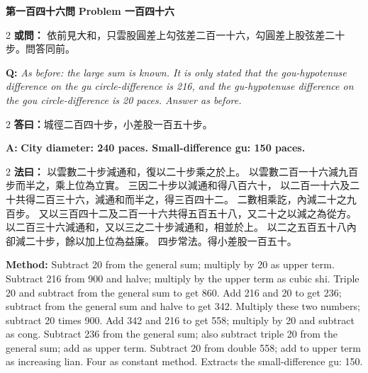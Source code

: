 \documentclass[11pt,a4paper]{article}
\newcommand{\wen}[1]{%
  \par\vspace{0.5em}%
  \noindent\textcolor{problemcolor}{\textbf{第#1問}}%
  \hfill\textcolor{problemcolor}{\textbf{Problem #1}}\par\nopagebreak%
  \vspace{0.3em}%
}
\newcommand{\owen}[1]{%
  \noindent\textcolor{problemcolor}{\textbf{或問：}}{\tradfont #1}\par\nopagebreak%
}
\newcommand{\oweneng}[1]{%
  \noindent\textcolor{engcolor}{\textbf{Q: }}{\itshape #1}\par\nopagebreak%
}
\newcommand{\fayue}[1]{%
  \noindent\textcolor{methodcolor}{\textbf{法曰：}}{\tradfont #1}\par\nopagebreak%
}
\newcommand{\fayueeng}[1]{%
  \noindent\textcolor{engcolor}{\textbf{Method: }}{#1}\par\nopagebreak%
}
\newcommand{\dayue}[1]{%
  \noindent\textcolor{anscolor}{\textbf{答曰：}}{\tradfont #1}\par\nopagebreak%
}
\newcommand{\dayueeng}[1]{%
  \noindent\textcolor{engcolor}{\textbf{A: }}{\bfseries #1}\par\nopagebreak%
}
\begin{document}
\vspace{0.5cm}

\wen{一百四十六}

\begin{paracol}{2}
\owen{%
依前見大和，只雲股圓差上勾弦差二百一十六，勾圓差上股弦差二十步。問答同前。}
\switchcolumn
\oweneng{%
As before: the large sum is known. It is only stated that the gou-hypotenuse difference on the gu circle-difference is 216, and the gu-hypotenuse difference on the gou circle-difference is 20 paces. Answer as before.}
\end{paracol}

\begin{paracol}{2}
\dayue{城徑二百四十步，小差股一百五十步。}
\switchcolumn
\dayueeng{City diameter: 240 paces. Small-difference gu: 150 paces.}
\end{paracol}

\begin{paracol}{2}
\fayue{%
以雲數二十步減通和，復以二十步乘之於上。
以雲數二百一十六減九百步而半之，乘上位為立實。
三因二十步以減通和得八百六十，
以二百一十六及二十共得二百三十六，減通和而半之，得三百四十二。
二數相乘訖，內減二十之九百步。
又以三百四十二及二百一十六共得五百五十八，又二十之以減之為從方。
以二百三十六減通和，又以三之二十步減通和，相並於上。
以二之五百五十八內卻減二十步，餘以加上位為益廉。
四步常法。得小差股一百五十。}
\switchcolumn
\fayueeng{%
Subtract 20 from the general sum; multiply by 20 as upper term. Subtract 216 from 900 and halve; multiply by the upper term as cubic shi. Triple 20 and subtract from the general sum to get 860. Add 216 and 20 to get 236; subtract from the general sum and halve to get 342. Multiply these two numbers; subtract 20 times 900. Add 342 and 216 to get 558; multiply by 20 and subtract as cong. Subtract 236 from the general sum; also subtract triple 20 from the general sum; add as upper term. Subtract 20 from double 558; add to upper term as increasing lian. Four as constant method. Extracts the small-difference gu: 150.}
\end{paracol}
\end{document}
